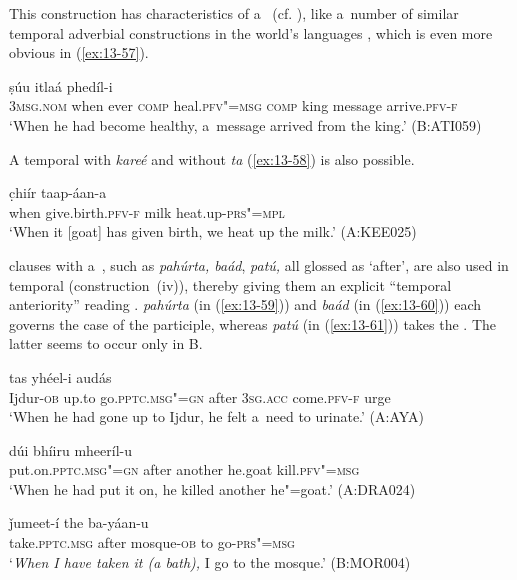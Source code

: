 This construction has characteristics of a~ (cf. ), like a~number of similar temporal adverbial constructions in the world's languages \citep[246--247]{thompsonetal2007}, which is even more obvious in (\ref{ex:13-57}).

\begin{exe}
\ex
\label{ex:13-57}
 ṣúu itlaá phedíl-i \\
\textsc{3msg.nom} when ever \textsc{comp} heal.\textsc{pfv"=msg} \textsc{comp} king message arrive.\textsc{pfv-f} \\
\glt `When he had become healthy, a~message arrived from the king.' (B:ATI059) 
\end{exe}

A  temporal  with \textit{kareé} and without \textit{ta} (\ref{ex:13-58}) is also possible.

\begin{exe}
\ex
\label{ex:13-58}
 c̣hiír taap-áan-a \\
when give.birth.\textsc{pfv-f} milk heat.up-\textsc{prs"=mpl} \\
\glt `When it [goat] has given birth, we heat up the milk.' (A:KEE025) 
\end{exe}

 clauses with a~, such as \textit{pahúrta, baád}, \textit{patú,} all glossed as `after', are also used in temporal  (construction~(iv)), thereby giving them an explicit ``temporal anteriority'' reading \citep[159]{cristofaro2005}. \textit{pahúrta} (in (\ref{ex:13-59})) and \textit{baád} (in (\ref{ex:13-60})) each governs the  case of the participle, whereas \textit{patú} (in (\ref{ex:13-61})) takes the . The latter seems to occur only in B. 

\begin{exe}
\ex
\label{ex:13-59}
\gll [iẓḍúur-a ǰe ɡúum"=ii pahúrta] tas yhéel-i audás \\
Ijdur-\textsc{ob} up.to go.\textsc{pptc.msg"=gn} after \textsc{3sg.acc} come.\textsc{pfv-f} urge \\
\glt `When he had gone up to Ijdur, he felt a~need to urinate.' (A:AYA)

\ex
\label{ex:13-60}
\gll [ṣaawóol"=ii baád] dúi bhíiru mheeríl-u \\
put.on.\textsc{pptc.msg"=gn} after another he.goat kill.\textsc{pfv"=msg}  \\
\glt `When he had put it on, he killed another he"=goat.' (A:DRA024)

\ex
\label{ex:13-61}
 ǰumeet-í the ba-yáan-u  \\
take.\textsc{pptc.msg} after mosque-\textsc{ob} to go-\textsc{prs"=msg} \\
\glt `\textit{When I have taken it (a bath),} I go to the mosque.' (B:MOR004) 
\end{exe}

